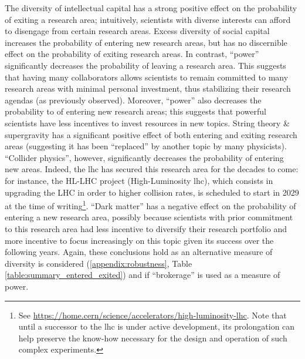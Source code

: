 \documentclass{article}
\begin{document}
The diversity of intellectual capital has a strong positive effect on the probability of exiting a research area; intuitively, scientists with diverse interests can afford to disengage from certain research areas. Excess diversity of social capital increases the probability of entering new research areas, but has no discernible effect on the probability of exiting research areas. In contrast, ``power'' significantly decreases the probability of leaving a research area. This suggests that having many collaborators allows scientists to remain committed to many research areas with minimal personal investment, thus stabilizing their research agendas (as previously observed). Moreover, ``power'' also decreases the probability to of entering new research areas; this suggests that powerful scientists have less incentives to invest resources in new topics. String theory \& supergravity has a significant positive effect of both entering and exiting research areas (suggesting it has been ``replaced'' by another topic by many physicists). ``Collider physics'', however, significantly decreases the probability of entering new areas. Indeed, the \gls{lhc} has secured this research area for the decades to come: %
for instance, the HL-LHC project (High-Luminosity \gls{lhc}), which consists in upgrading the LHC in order to higher collision rates, is scheduled to start in 2029 at the time of writing\footnote{See \url{https://home.cern/science/accelerators/high-luminosity-lhc}. Note that until a successor to the \gls{lhc} is under active development, its prolongation can help preserve the know-how necessary for the design and operation of such complex experiments.}. ``Dark matter'' has a negative effect on the probability of entering a new research area, possibly because scientists with prior commitment to this research area had less incentive to diversify their research portfolio and more incentive to focus increasingly on this topic given its success over the following years. Again, these conclusions hold as an alternative measure of diversity is considered (\ref{appendix:robustness}, Table \ref{table:summary_entered_exited}) and if ``brokerage'' is used as a measure of power.
 
\end{document}
